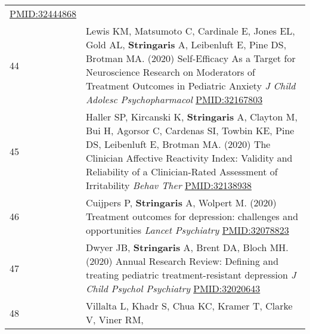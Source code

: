 \documentclass[
]{article}
\begin{document}
\begin{longtable}[]{@{}ll@{}}
\begin{minipage}[t]{0.94\columnwidth}
\url{PMID:32444868}\strut
\end{minipage}\tabularnewline
\begin{minipage}[t]{0.01\columnwidth}\raggedright
44\strut
\end{minipage} & \begin{minipage}[t]{0.94\columnwidth}\raggedright
Lewis KM, Matsumoto C, Cardinale E, Jones EL, Gold AL,
\textbf{Stringaris} A, Leibenluft E, Pine DS, Brotman MA. (2020)
Self-Efficacy As a Target for Neuroscience Research on Moderators of
Treatment Outcomes in Pediatric Anxiety \emph{J Child Adolesc
Psychopharmacol} \url{PMID:32167803}\strut
\end{minipage}\tabularnewline
\begin{minipage}[t]{0.01\columnwidth}\raggedright
45\strut
\end{minipage} & \begin{minipage}[t]{0.94\columnwidth}\raggedright
Haller SP, Kircanski K, \textbf{Stringaris} A, Clayton M, Bui H, Agorsor
C, Cardenas SI, Towbin KE, Pine DS, Leibenluft E, Brotman MA. (2020) The
Clinician Affective Reactivity Index: Validity and Reliability of a
Clinician-Rated Assessment of Irritability \emph{Behav Ther}
\url{PMID:32138938}\strut
\end{minipage}\tabularnewline
\begin{minipage}[t]{0.01\columnwidth}\raggedright
46\strut
\end{minipage} & \begin{minipage}[t]{0.94\columnwidth}\raggedright
Cuijpers P, \textbf{Stringaris} A, Wolpert M. (2020) Treatment outcomes
for depression: challenges and opportunities \emph{Lancet Psychiatry}
\url{PMID:32078823}\strut
\end{minipage}\tabularnewline
\begin{minipage}[t]{0.01\columnwidth}\raggedright
47\strut
\end{minipage} & \begin{minipage}[t]{0.94\columnwidth}\raggedright
Dwyer JB, \textbf{Stringaris} A, Brent DA, Bloch MH. (2020) Annual
Research Review: Defining and treating pediatric treatment-resistant
depression \emph{J Child Psychol Psychiatry} \url{PMID:32020643}\strut
\end{minipage}\tabularnewline
\begin{minipage}[t]{0.01\columnwidth}\raggedright
48\strut
\end{minipage} & \begin{minipage}[t]{0.94\columnwidth}\raggedright
Villalta L, Khadr S, Chua KC, Kramer T, Clarke V, Viner RM,

\end{minipage}
\end{longtable}
\end{document}
